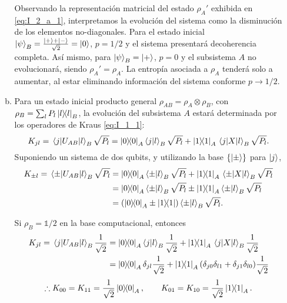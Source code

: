 \documentclass{scrartcl}
\newcommand{\inv}[1]{\frac{1}{#1}}
\DeclareRobustCommand{\[}{\begin{equation}}
\DeclareRobustCommand{\]}{\end{equation}}
\begin{document}
\begin{enumerate}
\begin{enumerate}[a)]
        Observando la representación matricial del estado $\rho_A'$ exhibida en \eqref{eq:I_2_a_1}, interpretamos la evolución del sistema como la disminución de los elementos no-diagonales. Para el estado inicial $\ket{\psi}_B = \frac{\ket{+} + \ket{-}}{\sqrt{2}} = \ket{0}$, $p = 1/2$ y el sistema presentará decoherencia completa. Así mismo, para $\ket{\psi}_B = \ket{+}$, $p = 0$ y el subsistema $A$ no evolucionará, siendo $\rho_A' = \rho_A$. La entropía asociada a $\rho_A$ tenderá solo a aumentar, al estar eliminando información del sistema conforme $p \to 1/2$.
        
        
        \item Para un estado inicial producto general $\rho_{AB} = \rho_A \otimes \rho_B$, con $\rho_B = \sum_l P_l \dyad{l}{l}_B$, la evolución del subsistema $A$ estará determinada por los operadores de Kraus \eqref{eq:I_1_1}:
        \[ K_{jl} = \mel{j}{U_{AB}}{l}_B \sqrt{P_l} = \dyad{0}{0}_A \ip{j}{l}_B \sqrt{P_l} + \dyad{1}{1}_A \mel{j}{X}{l}_B \sqrt{P_l}. \]
        Suponiendo un sistema de dos qubits, y utilizando la base $\{ \ket{\pm} \}$ para $\ket{j}$, 
        \begin{align}
            K_{\pm l} = \mel{\pm}{U_{AB}}{l}_B \sqrt{P_l} &= \dyad{0}{0}_A \ip{\pm}{l}_B \sqrt{P_l} + \dyad{1}{1}_A \mel{\pm}{X}{l}_B \sqrt{P_l} \\
                &= \dyad{0}{0}_A \ip{\pm}{l}_B \sqrt{P_l} \pm \dyad{1}{1}_A \ip{\pm}{l}_B \sqrt{P_l} \\
                &= (\dyad{0}{0}_A \pm \dyad{1}{1}) \ip{\pm}{l}_B \sqrt{P_l}.
        \end{align}
        
        Si $\rho_B = \mathds{1}/2$ en la base computacional, entonces
        \begin{align}
            K_{jl} = \mel{j}{U_{AB}}{l}_B \inv{\sqrt{2}} &= \dyad{0}{0}_A \ip{j}{l}_B \inv{\sqrt{2}} + \dyad{1}{1}_A \mel{j}{X}{l}_B \inv{\sqrt{2}} \\
                &= \dyad{0}{0}_A \delta_{jl} \inv{\sqrt{2}} + \dyad{1}{1}_A (\delta_{j0} \delta_{l1} + \delta_{j1} \delta_{l0}) \inv{\sqrt{2}} \\
        \end{align}
        \[ \therefore K_{00} = K_{11} = \inv{\sqrt{2}} \dyad{0}{0}_A, \quad \quad K_{01} = K_{10} = \inv{\sqrt{2}} \dyad{1}{1}_A. \]
        
\end{enumerate}
        

\end{enumerate}
\end{document}
